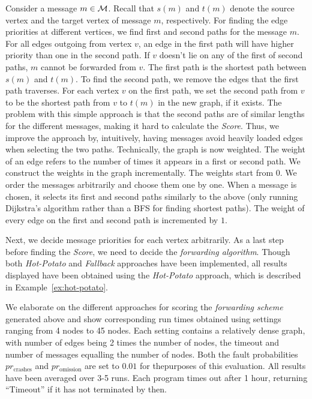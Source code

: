 \documentclass[11pt,eepic]{article}
\newcommand{\M}{{\cal M}}
\begin{document}
		Consider a message $m \in \M$. Recall that $s(m)$ and $t(m)$ denote the source vertex
		and the target vertex of message $m$, respectively. For finding the edge priorities at different vertices, we find first and second paths for the message $m$. For all edges outgoing from vertex $v$, an edge in the first path will have higher priority than one in the second path. If $v$ doesn't lie on any of the first of second paths, $m$ cannot be forwarded from $v$.
		The first path is the shortest path between $s(m)$ and $t(m)$.
		To find the second path, we remove the edges that the first path traverses.
		For each vertex $v$ on the first path,
		we set the second path from $v$ to be the shortest path from $v$ to $t(m)$ in the new graph, if it exists.
		The problem with this simple approach is that the second paths are of similar lengths for the different messages, making it hard to calculate the {\em Score}. Thus, we improve the approach by, intuitively, having messages avoid heavily loaded edges when selecting the two paths. Technically, the graph is now weighted. The weight of an edge refers to the number of times it appears in a first or second path. We construct the weights in the graph incrementally. The weights start from $0$. We order the messages arbitrarily and choose them one by one. When a message is chosen, it selects its first and second paths similarly to the above (only running Dijkstra's algorithm rather than a BFS for finding shortest paths). The weight of every edge on the first and second path is incremented by $1$.

		Next, we decide message priorities for each vertex arbitrarily.
		As a last step before finding the {\em Score}, we need to decide the {\em forwarding algorithm}. Though both {\em Hot-Potato} and {\em Fallback} approaches have been implemented, all results displayed have been obtained using the {\em Hot-Potato} approach, which is described in Example~\ref{ex:hot-potato}.

		We elaborate on the different approaches for scoring the {\em forwarding scheme} generated above and show corresponding run times obtained using settings ranging from 4 nodes to 45 nodes. Each setting contains a relatively dense graph, with number of edges being 2 times the number of nodes, the timeout and number of messages equalling the number of nodes. Both the fault probabilities $pr_{\text{crashes}}$ and $pr_{\text{omission}}$ are set to $0.01$ for thepurposes of this evaluation. All results have been averaged over 3-5 runs. Each program times out after 1 hour, returning ``Timeout'' if it has not terminated by then.
\end{document}
